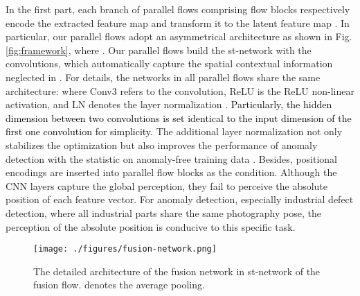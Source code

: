 \documentclass[lettersize,journal]{IEEEtran}
\newcommand{\rounda}[1]{\textcolor{black}{#1}}
\begin{document}
In the first part, each branch of parallel flows  comprising  flow blocks respectively encode the extracted feature map  and transform it to the latent feature map . 
In particular, our parallel flows adopt an asymmetrical architecture as shown in Fig. \ref{fig:framework}, where .
Our parallel flows build the st-network  with the  convolutions, which automatically capture the spatial contextual information neglected in \cite{gudovskiy2022cflow}.
For details, the  networks in all parallel flows share the same architecture:
\rounda{}
where Conv3 refers to the  convolution, ReLU is the ReLU non-linear activation, and LN denotes the layer normalization \cite{ba2016layer}.
\rounda{
Particularly, the hidden dimension between two  convolutions is set identical to the input dimension of the first one  convolution for simplicity.}
The additional layer normalization not only stabilizes the optimization but also improves the performance of anomaly detection with the statistic on anomaly-free training data \cite{song2019unsupervised}.
Besides, positional encodings \cite{vaswani2017attention} are inserted into parallel flow blocks as the condition. Although the CNN layers capture the global perception, they fail to perceive the absolute position of each feature vector. For anomaly detection, especially industrial defect detection, where all industrial parts share the same photography pose, the perception of the absolute position is conducive to this specific task.

\begin{figure}
  \centering
  \texttt{[image: ./figures/fusion-network.png]}
  \caption{The detailed architecture of the fusion network  in st-network of the fusion flow.  denotes the average pooling.} \label{fig:fuse-network}
  \label{fig:fusion-network}
\end{figure}
\end{document}
